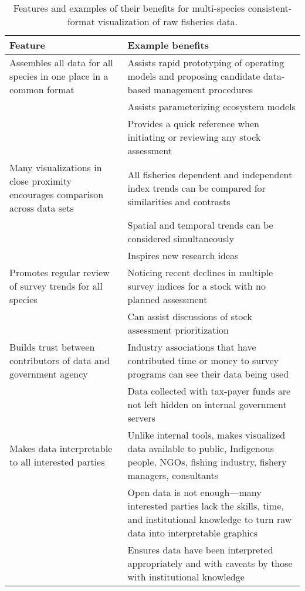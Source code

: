 \documentclass[12pt,]{article}
\begin{document}
\begin{table}

\caption{\label{tab:benefits}Features and examples of their benefits for multi-species consistent-format visualization of raw fisheries data.}
\centering
\begin{tabular}[t]{>{\raggedright\arraybackslash}p{6.2cm}>{\raggedright\arraybackslash}p{9.7cm}}
\toprule
Feature & Example benefits\\
\midrule
Assembles all data for all species in one place in a common format & Assists rapid prototyping of operating models and proposing candidate data-based management procedures\\
\addlinespace
 & Assists parameterizing ecosystem models\\
\addlinespace
 & Provides a quick reference when initiating or reviewing any stock assessment\\
\addlinespace
Many visualizations in close proximity encourages comparison across data sets & All fisheries dependent and independent index trends can be compared for similarities and contrasts\\
\addlinespace
 & Spatial and temporal trends can be considered simultaneously\\
\addlinespace
 & Inspires new research ideas\\
\addlinespace
Promotes regular review of survey trends for all species & Noticing recent declines in multiple survey indices for a stock with no planned assessment\\
\addlinespace
 & Can assist discussions of stock assessment prioritization\\
\addlinespace
Builds trust between contributors of data and government agency & Industry associations that have contributed time or money to survey programs can see their data being used\\
\addlinespace
 & Data collected with tax-payer funds are not left hidden on internal government servers\\
\addlinespace
Makes data interpretable to all interested parties & Unlike internal tools, makes visualized data available to public, Indigenous people, NGOs, fishing industry, fishery managers, consultants\\
\addlinespace
 & Open data is not enough---many interested parties lack the skills, time, and institutional knowledge to turn raw data into interpretable graphics\\
\addlinespace
 & Ensures data have been interpreted appropriately and with caveats by those with institutional knowledge\\

\end{tabular}
\end{table}
\end{document}
